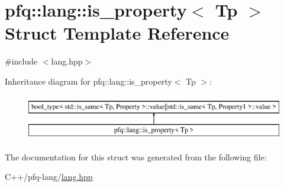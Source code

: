 \hypertarget{structpfq_1_1lang_1_1is__property}{\section{pfq\+:\+:lang\+:\+:is\+\_\+property$<$ Tp $>$ Struct Template Reference}
\label{structpfq_1_1lang_1_1is__property}
}


{\ttfamily \#include $<$lang.\+hpp$>$}

Inheritance diagram for pfq\+:\+:lang\+:\+:is\+\_\+property$<$ Tp $>$\+:\begin{figure}[H]
\begin{center}
\leavevmode
\includegraphics[height=2.000000cm]{structpfq_1_1lang_1_1is__property}
\end{center}
\end{figure}


The documentation for this struct was generated from the following file\+:\begin{DoxyCompactItemize}
\item 
C++/pfq-\/lang/\hyperlink{lang_8hpp}{lang.\+hpp}\end{DoxyCompactItemize}
